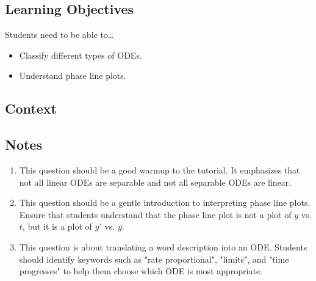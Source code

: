 \subsection*{Learning Objectives}
Students need to be able to\ldots
\begin{itemize}
	\item Classify different types of ODEs.
    \item Understand phase line plots.
\end{itemize}

\subsection*{Context}

\subsection*{Notes}
\begin{enumerate}
	\item This question should be a good warmup to the tutorial. It emphasizes that not all linear ODEs are separable and not all separable ODEs are linear. 
    \item This question should be a gentle introduction to interpreting phase line plots. Ensure that students understand that the phase line plot is not a plot of $y$ vs. $t$, but it is a plot of $y'$ vs. $y$.
    \item This question is about translating a word description into an ODE. Students should identify keywords such as "rate proportional", "limits", and "time progresses" to help them choose which ODE is most appropriate.
\end{enumerate}